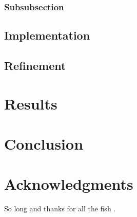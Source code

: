 \documentclass[fleqn,10pt]{SelfArx} %
\begin{document}
\subsubsection{Subsubsection}

\lipsum[14] %

\subsection{Implementation}

\lipsum[15-23] %

\subsection{Refinement}

\lipsum[15-23] %

\section{Results}
\lipsum[15-23] %
\section{Conclusion}
\lipsum[15-23] %



\section*{Acknowledgments} %


So long and thanks for all the fish \cite{Figueredo:2009dg, Smith:2012qr}.





\end{document}
